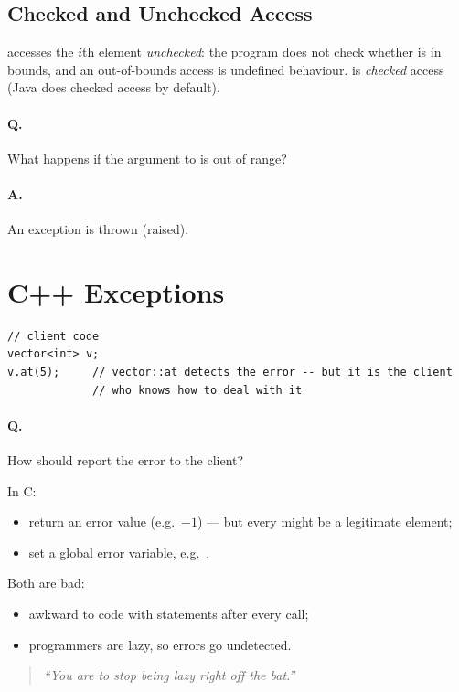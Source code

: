 \subsection{Checked and Unchecked Access}
 accesses the $i$th element \emph{unchecked}: the program does not
check whether  is in bounds, and an out-of-bounds access is undefined
behaviour.  is \emph{checked} access (Java does checked access by
default).

\paragraph{Q.} What happens if the argument to  is out of range?

\paragraph{A.} An exception is thrown (raised).

\section{C++ Exceptions}
\begin{lstlisting}[style=cpp]
// client code
vector<int> v;
v.at(5);     // vector::at detects the error -- but it is the client
             // who knows how to deal with it
\end{lstlisting}

\paragraph{Q.} How should  report the error to the client?

In C:
\begin{itemize}
  \item return an error value (e.g.\ $-1$) --- but every  might be a
        legitimate element;
  \item set a global error variable, e.g.\ .
\end{itemize}
Both are bad:
\begin{itemize}
  \item awkward to code with  statements after every call;
  \item programmers are lazy, so errors go undetected.
\end{itemize}
\begin{quote}
\textit{``You are to stop being lazy right off the bat.''}
\end{quote}

